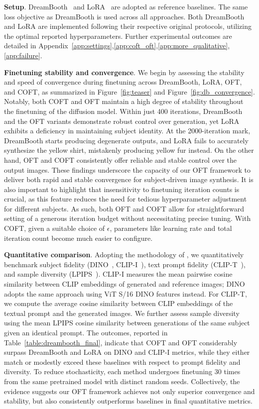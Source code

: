 \textbf{Setup}. DreamBooth~\cite{ruiz2023dreambooth} and LoRA~\cite{hulora2022} are adopted as reference baselines. The same loss objective as DreamBooth is used across all approaches. Both DreamBooth and LoRA are implemented following their respective original protocols, utilizing the optimal reported hyperparameters. Further experimental outcomes are detailed in Appendix~\ref{app:settings},\ref{app:coft_oft},\ref{app:more_qualitative},\ref{app:failure}.

\textbf{Finetuning stability and convergence}. We begin by assessing the stability and speed of convergence during finetuning across DreamBooth, LoRA, OFT, and COFT, as summarized in Figure~\ref{fig:teaser} and Figure~\ref{fig:db_convergence}. Notably, both COFT and OFT maintain a high degree of stability throughout the finetuning of the diffusion model. Within just 400 iterations, DreamBooth and the OFT variants demonstrate robust control over generation, yet LoRA exhibits a deficiency in maintaining subject identity. At the 2000-iteration mark, DreamBooth starts producing degenerate outputs, and LoRA fails to accurately synthesize the yellow shirt, mistakenly producing yellow fur instead. On the other hand, OFT and COFT consistently offer reliable and stable control over the output images. These findings underscore the capacity of our OFT framework to deliver both rapid and stable convergence for subject-driven image synthesis. It is also important to highlight that insensitivity to finetuning iteration counts is crucial, as this feature reduces the need for tedious hyperparameter adjustment for different subjects. As such, both OFT and COFT allow for straightforward setting of a generous iteration budget without necessitating precise tuning. With COFT, given a suitable choice of $\epsilon$, parameters like learning rate and total iteration count become much easier to configure.

\textbf{Quantitative comparison}. Adopting the methodology of \cite{ruiz2023dreambooth}, we quantitatively benchmark subject fidelity (DINO~\cite{caron2021emerging}, CLIP-I~\cite{radford2021learning}), text prompt fidelity (CLIP-T~\cite{radford2021learning}), and sample diversity (LPIPS~\cite{zhang2018unreasonable}). CLIP-I measures the mean pairwise cosine similarity between CLIP embeddings of generated and reference images; DINO adopts the same approach using ViT S/16 DINO features instead. For CLIP-T, we compute the average cosine similarity between CLIP embeddings of the textual prompt and the generated images. We further assess sample diversity using the mean LPIPS cosine similarity between generations of the same subject given an identical prompt. The outcomes, reported in Table~\ref{table:dreambooth_final}, indicate that COFT and OFT considerably surpass DreamBooth and LoRA on DINO and CLIP-I metrics, while they either match or modestly exceed these baselines with respect to prompt fidelity and diversity. To reduce stochasticity, each method undergoes finetuning 30 times from the same pretrained model with distinct random seeds. Collectively, the evidence suggests our OFT framework achieves not only superior convergence and stability, but also consistently outperforms baselines in final quantitative metrics.

